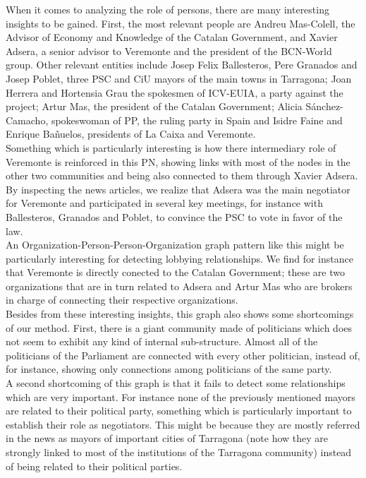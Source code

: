 When it comes to analyzing the role of persons, there are many interesting insights to be gained. First, the most relevant people are Andreu Mas-Colell, the Advisor of Economy and Knowledge of the Catalan Government, and Xavier Adsera, a senior advisor to Veremonte and the president of the BCN-World group. Other relevant entities include Josep Felix Ballesteros, Pere Granados and Josep Poblet, three PSC and CiU mayors of the main towns in Tarragona; Joan Herrera and Hortensia Grau the spokesmen of ICV-EUIA, a party against the project; Artur Mas, the president of the Catalan Government;  Alicia S\'anchez-Camacho, spokeswoman of PP, the ruling party in Spain and Isidre Faine and Enrique Ba\~nuelos, presidents of La Caixa and Veremonte. \\

Something which is particularly interesting is how there intermediary role of Veremonte is reinforced in this PN, showing links with most of the nodes in the other two communities and being also connected to them through Xavier Adsera. By inspecting the news articles, we realize that Adsera was the main negotiator for Veremonte and participated in several key meetings, for instance with Ballesteros, Granados and Poblet, to convince the PSC to vote in favor of the law. \\

An Organization-Person-Person-Organization graph pattern like this might be particularly interesting for detecting lobbying relationships. We find for instance that Veremonte is directly conected to the Catalan Government; these are two organizations that are in turn related to Adsera and Artur Mas who are brokers in charge of connecting their respective organizations. \\

Besides from these interesting insights, this graph also shows some shortcomings of our method. First, there is a giant community made of politicians which does not seem to exhibit any kind of internal sub-structure. Almost all of the politicians of the Parliament are connected with every other politician, instead of, for instance, showing only connections among politicians of the same party. \\

A second shortcoming of this graph is that it fails to detect some relationships which are very important. For instance none of the previously mentioned mayors are related to their political party, something which is particularly important to establish their role as negotiators. This might be because they are mostly referred in the news as mayors of important cities of Tarragona (note how they are strongly linked to most of the institutions of the Tarragona community) instead of being related to their political parties. 


